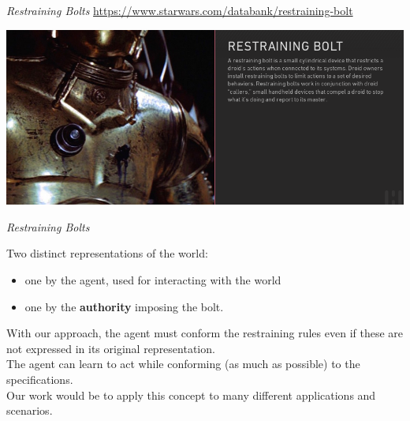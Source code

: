 \documentclass{beamer}
\begin{document}
\begin{frame}{\emph{Restraining Bolts}}
	\url{https://www.starwars.com/databank/restraining-bolt}
	\begin{center}
	\includegraphics[width=\textwidth]{images//restraining-bolt}
	\end{center}

\end{frame}

\begin{frame}{\emph{Restraining Bolts}}
	
	Two distinct representations of the world:
	\begin{itemize}
		\item one by the agent, used for interacting with the world
		\item one by the \textbf{authority} imposing the bolt.
	\end{itemize}
	
	\vspace{0.3cm}
	With our approach, the agent must conform the restraining rules even if these are not expressed in its original	representation.\\
	
	The agent can learn to act while conforming (as much as possible) to the \LLf specifications.\\
	
	\vspace{0.3cm}
	Our work would be to apply this concept to many different applications and scenarios.\\
	
\end{frame}

\begin{frame}
	
\end{frame}
		
	
	
	
	
\end{document}
